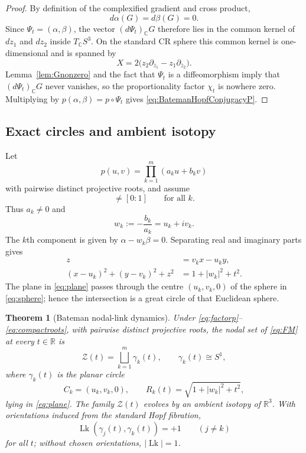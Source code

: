 \documentclass[aps,prd,reprint,nofootinbib,superscriptaddress]{revtex4-2}
\newtheorem{theorem}{Theorem}[section]
\theoremstyle{definition}
\theoremstyle{remark}
\newcommand{\R}{\mathbb{R}}
\newcommand{\cZ}{\mathcal{Z}}
\newcommand{\Lk}{\operatorname{Lk}}
\begin{document}
\begin{proof}
By definition of the complexified gradient and cross product,
\[
 d\alpha(G)=d\beta(G)=0.
\]
Since $\Psi_t=(\alpha,\beta)$, the vector $(d\Psi_t)_{\mathbb C}G$ therefore lies in the common kernel of $dz_1$ and $dz_2$ inside $T_{\mathbb C}S^3$.  On the standard CR sphere this common kernel is one-dimensional and is spanned by
\[
X=2\bigl(z_2\partial_{\bar z_1}-z_1\partial_{\bar z_2}\bigr).
\]
Lemma~\ref{lem:Gnonzero} and the fact that $\Psi_t$ is a diffeomorphism imply that $(d\Psi_t)_{\mathbb C}G$ never vanishes, so the proportionality factor $\chi_t$ is nowhere zero.  Multiplying by $p(\alpha,\beta)=p\circ\Psi_t$ gives \eqref{eq:BatemanHopfConjugacyP}.
\end{proof}

\subsection{Exact circles and ambient isotopy}

Let
\begin{equation}
p(u,v)=\prod_{k=1}^m(a_ku+b_kv)
\label{eq:factorp}
\end{equation}
with pairwise distinct projective roots, and assume
\begin{equation}
[a_k:b_k]\ne[0:1]
\qquad\text{for all }k.
\label{eq:compactroots}
\end{equation}
Thus $a_k\ne0$ and
\begin{equation}
w_k:=-\frac{b_k}{a_k}=u_k+iv_k.
\label{eq:wk}
\end{equation}
The $k$th component is given by $\alpha-w_k\beta=0$. Separating real and imaginary parts gives
\begin{align}
z&=v_kx-u_ky,\label{eq:plane}\\
(x-u_k)^2+(y-v_k)^2+z^2
&=1+|w_k|^2+t^2.\label{eq:sphere}
\end{align}
The plane in \eqref{eq:plane} passes through the centre $(u_k,v_k,0)$ of the sphere in \eqref{eq:sphere}; hence the intersection is a great circle of that Euclidean sphere.

\begin{theorem}[Bateman nodal-link dynamics]
\label{thm:Bateman}
Under \eqref{eq:factorp}--\eqref{eq:compactroots}, with pairwise distinct projective roots, the nodal set of \eqref{eq:FM} at every $t\in\R$ is
\begin{equation}
\cZ(t)=\bigsqcup_{k=1}^m\gamma_k(t),
\qquad \gamma_k(t)\cong S^1,
\label{eq:nodalcircles}
\end{equation}
where $\gamma_k(t)$ is the planar circle
\begin{equation}
C_k=(u_k,v_k,0),
\qquad
R_k(t)=\sqrt{1+|w_k|^2+t^2},
\label{eq:circledata}
\end{equation}
lying in \eqref{eq:plane}. The family $\cZ(t)$ evolves by an ambient isotopy of $\R^3$. With orientations induced from the standard Hopf fibration,
\begin{equation}
\Lk(\gamma_j(t),\gamma_k(t))=+1
\qquad(j\ne k)
\label{eq:linking}
\end{equation}
for all $t$; without chosen orientations, $|\Lk|=1$.
\end{theorem}
\end{document}
